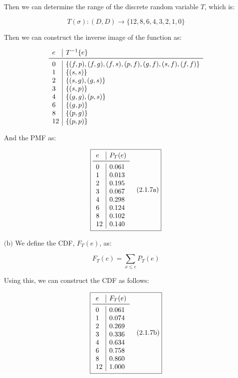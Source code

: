 \documentclass{article}
\newcommand{\subproblem}[3]{$\boxed{\text{(#3)}}$}
\newcommand{\subsolution}[4]{\boxed{#4\quad(\text{#1.#2#3})}}
\newcommand{\inv}[1]{#1^{-1}}
\begin{document}
Then we can determine the range of the discrete random variable $T$,
which is:

\[
T(\sigma):(D,D)\rightarrow\{12,8,6,4,3,2,1,0\}
\]

Then we can construct the inverse image of the function as:

\[
\begin{array}{l|l}
e & \inv{T}\{e\} \\
\midrule
0 & \{(f,p),(f,g),(f,s),(p,f),(g,f),(s,f),(f,f)\} \\
1 & \{(s,s)\} \\
2 & \{(s,g),(g,s)\} \\
3 & \{(s,p)\} \\
4 & \{(g,g),(p,s)\} \\
6 & \{(g,p)\} \\
8 & \{(p,g)\} \\
12 & \{(p,p)\} \\
\end{array}
\]

And the PMF as:

\[
\subsolution{2.1}{7}{a}{\begin{array}{l|l}
e & P_T(e) \\
\midrule
0& 0.061 \\
1& 0.013 \\
2& 0.195 \\
3& 0.067 \\
4& 0.298 \\
6& 0.124 \\
8& 0.102 \\
12& 0.140 \\
\end{array}}
\]

%
\subproblem{2.1}{7}{b} We define the CDF, $F_T(e)$, as:

\[
F_T(e)=\sum\limits_{x\le e}P_T(e)
\]

Using this, we can construct the CDF as follows:

\[
\subsolution{2.1}{7}{b}{\begin{array}{l|l}
e & F_T(e) \\
\midrule
0& 0.061 \\
1& 0.074 \\
2& 0.269 \\
3& 0.336 \\
4& 0.634 \\
6& 0.758 \\
8& 0.860 \\
12& 1.000 \\
\end{array}}
\]
\end{document}

